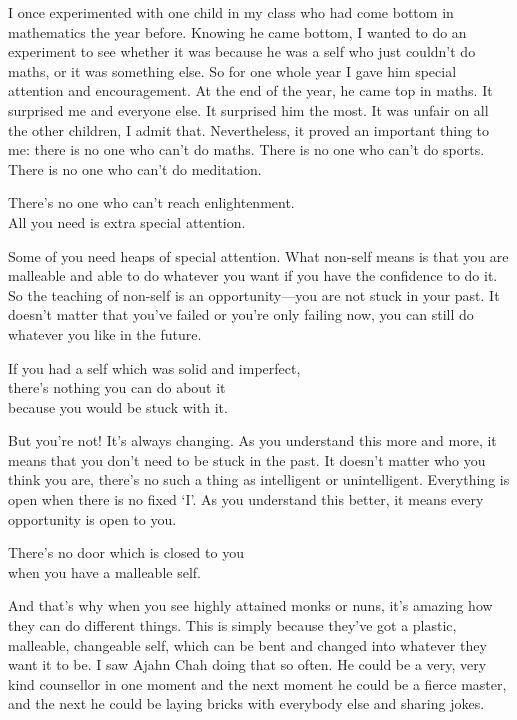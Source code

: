 \documentclass[12pt, openany]{book}
\newenvironment{aphorism}%
{%
\begin{center}\begin{itshape}
}%
{\end{itshape}\end{center}
}%
\begin{document}
I once experimented with one child in my class who had come bottom in mathematics the year before. Knowing he came bottom, I wanted to do an experiment to see whether it was because he was a self who just couldn’t do maths, or it was something else. So for one whole year I gave him special attention and encouragement. At the end of the year, he came top in maths. It surprised me and everyone else. It surprised him the most. It was unfair on all the other children, I admit that. Nevertheless, it proved an important thing to me: there is no one who can’t do maths. There is no one who can’t do sports. There is no one who can’t do meditation. 

\begin{aphorism}
There’s no one who can’t reach enlightenment.\\  
All you need is extra special attention.
\end{aphorism}

Some of you need heaps of special attention. What non-self means is that you are malleable and able to do whatever you want if you have the confidence to do it. So the teaching of non-self is an opportunity—you are not stuck in your past. It doesn’t matter that you’ve failed or you’re only failing now, you can still do whatever you like in the future. 

\begin{aphorism}
If you had a self which was solid and imperfect,\\  
there’s nothing you can do about it\\ 
because you would be stuck with it.
\end{aphorism}

But you’re not! It’s always changing. As you understand this more and more, it means that you don’t need to be stuck in the past. It doesn’t matter who you think you are, there’s no such a thing as intelligent or unintelligent. Everything is open when there is no fixed ‘I’. As you understand this better, it means every opportunity is open to you. 

\begin{aphorism}
There’s no door which is closed to you\\  
when you have a malleable self.
\end{aphorism}

And that’s why when you see highly attained monks or nuns, it’s amazing how they can do different things. This is simply because they’ve got a plastic, malleable, changeable self, which can be bent and changed into whatever they want it to be. I saw Ajahn Chah doing that so often. He could be a very, very kind counsellor in one moment and the next moment he could be a fierce master, and the next he could be laying bricks with everybody else and sharing jokes. 
\end{document}
